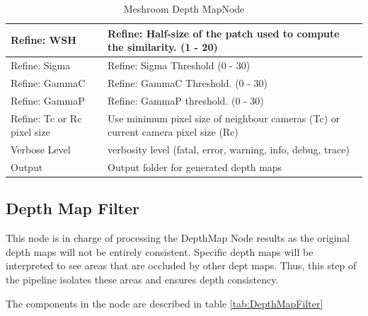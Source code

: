 \documentclass[12pt]{report}
\begin{document}
\begin{table}[H]
{\begin{tabular}{|l|l|}
    Refine: WSH                         & Refine: Half-size of the patch used to compute the similarity. (1 - 20) \\ \hline
    Refine: Sigma                       & Refine: Sigma Threshold (0 - 30)                                        \\ \hline
    Refine: GammaC                      & Refine: GammaC Threshold. (0 - 30)                                      \\ \hline
    Refine: GammaP                      & Refine: GammaP threshold. (0 - 30)                                      \\ \hline
    Refine: Tc or Rc pixel size    & Use minimum pixel size of neighbour cameras (Tc) or current camera pixel size (Rc)                                \\ \hline
    Verbose Level                       & verbosity level (fatal, error, warning, info, debug, trace)             \\ \hline
    Output                              & Output folder for generated depth maps                                  \\ \hline
    \end{tabular}%
    }
    \caption{Meshroom Depth MapNode}
    \label{tab:DepthMap}
    \end{table}
  
  

\subsection{Depth Map Filter}
This node is in charge of processing the DepthMap Node results as the original depth maps will not be entirely consistent.
Specific depth maps will be interpreted to see areas that are occluded by other dept maps. Thus, this step of the pipeline isolates these areas and ensures depth consistency.

The components in the node are described in table \ref{tab:DepthMapFilter}
\end{document}
